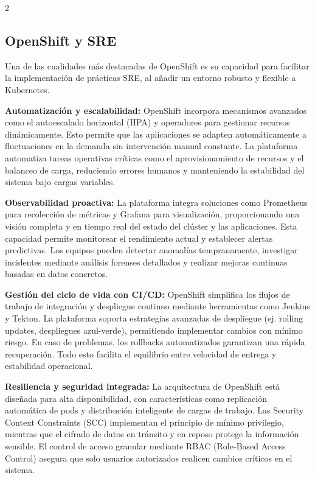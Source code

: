 \begin{multicols*}{2}
\subsection{OpenShift y SRE}

Una de las cualidades más destacadas de OpenShift es su capacidad para facilitar la implementación de prácticas SRE, al añadir un entorno robusto y flexible a Kubernetes.

\noindent\textbf{Automatización y escalabilidad:}  
OpenShift incorpora mecanismos avanzados como el autoescalado horizontal (HPA) y operadores para gestionar recursos dinámicamente. Esto permite que las aplicaciones se adapten automáticamente a fluctuaciones en la demanda sin intervención manual constante. La plataforma automatiza tareas operativas críticas como el aprovisionamiento de recursos y el balanceo de carga, reduciendo errores humanos y manteniendo la estabilidad del sistema bajo cargas variables.

\noindent\textbf{Observabilidad proactiva:}  
La plataforma integra soluciones como Prometheus para recolección de métricas y Grafana para visualización, proporcionando una visión completa y en tiempo real del estado del clúster y las aplicaciones. Esta capacidad permite monitorear el rendimiento actual y establecer alertas predictivas. Los equipos pueden detectar anomalías tempranamente, investigar incidentes mediante análisis forenses detallados y realizar mejoras continuas basadas en datos concretos.

\noindent\textbf{Gestión del ciclo de vida con CI/CD:}  
OpenShift simplifica los flujos de trabajo de integración y despliegue continuo mediante herramientas como Jenkins y Tekton. La plataforma soporta estrategias avanzadas de despliegue (ej. rolling updates, despliegues azul-verde), permitiendo implementar cambios con mínimo riesgo. En caso de problemas, los rollbacks automatizados garantizan una rápida recuperación. Todo esto facilita el equilibrio entre velocidad de entrega y estabilidad operacional.

\noindent\textbf{Resiliencia y seguridad integrada:}  
La arquitectura de OpenShift está diseñada para alta disponibilidad, con características como replicación automática de pods y distribución inteligente de cargas de trabajo. Las Security Context Constraints (SCC) implementan el principio de mínimo privilegio, mientras que el cifrado de datos en tránsito y en reposo protege la información sensible. El control de acceso granular mediante RBAC (Role-Based Access Control) asegura que solo usuarios autorizados realicen cambios críticos en el sistema.

\end{multicols*}

